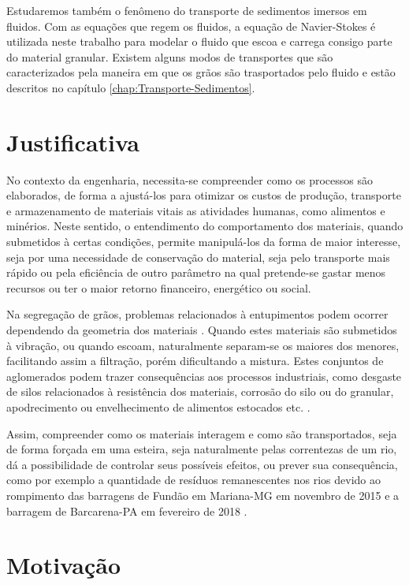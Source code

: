     Estudaremos também o fenômeno do transporte de sedimentos imersos em fluidos. Com as equações que regem os fluidos, a equação de Navier-Stokes \cite{Physical_Hydrodynamics, Fluid_Mechanics} é utilizada neste trabalho para modelar o fluido que escoa e carrega consigo parte do material granular. Existem alguns modos de transportes que são caracterizados pela maneira em que os grãos são trasportados pelo fluido e estão descritos no capítulo \ref{chap:Transporte-Sedimentos}.

\section{Justificativa}
\label{sec:justificativa}

    No contexto da engenharia, necessita-se compreender como os processos são elaborados, de forma a ajustá-los para otimizar os custos de produção, transporte e armazenamento de materiais vitais as atividades humanas, como alimentos e minérios. Neste sentido, o entendimento do comportamento dos materiais, quando submetidos à certas condições, permite manipulá-los da forma de maior interesse, seja por uma necessidade de conservação do material, seja pelo transporte mais rápido ou pela eficiência de outro parâmetro na qual pretende-se gastar menos recursos ou ter o maior retorno financeiro, energético ou social.

    Na segregação de grãos, problemas relacionados à entupimentos podem ocorrer dependendo da geometria dos materiais \cite{Caio-Tese}. Quando estes materiais são submetidos à vibração, ou quando escoam, naturalmente separam-se os maiores dos menores, facilitando assim a filtração, porém dificultando a mistura. Estes conjuntos de aglomerados podem trazer consequências aos processos industriais, como desgaste de silos relacionados à resistência dos materiais, corrosão do silo ou do granular, apodrecimento ou envelhecimento de alimentos estocados etc. \cite{Silo_failures}.

    Assim, compreender como os materiais interagem e como são transportados, seja de forma forçada em uma esteira, seja naturalmente pelas correntezas de um rio, dá a possibilidade de controlar seus possíveis efeitos, ou prever sua consequência, como por exemplo a quantidade de resíduos remanescentes nos rios devido ao rompimento das barragens de Fundão em Mariana-MG em novembro de 2015 \cite{Mariana} e a barragem de Barcarena-PA em fevereiro de 2018 \cite{Barcarena}.

\section{Motivação}
\label{sec:motivacao}

